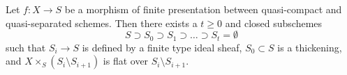 \begin{lemma}
\label{lemma-generic-flatness-stratification-scheme}
Let $f : X \to S$ be a morphism of finite presentation between quasi-compact
and quasi-separated schemes. Then there exists a $t \geq 0$ and closed
subschemes
$$
S \supset S_0 \supset S_1 \supset \ldots \supset S_t = \emptyset
$$
such that $S_i \to S$ is defined by a finite type ideal sheaf,
$S_0 \subset S$ is a thickening, and
$X \times_S (S_i \setminus S_{i + 1})$ is flat over $S_i \setminus S_{i + 1}$.
\end{lemma}